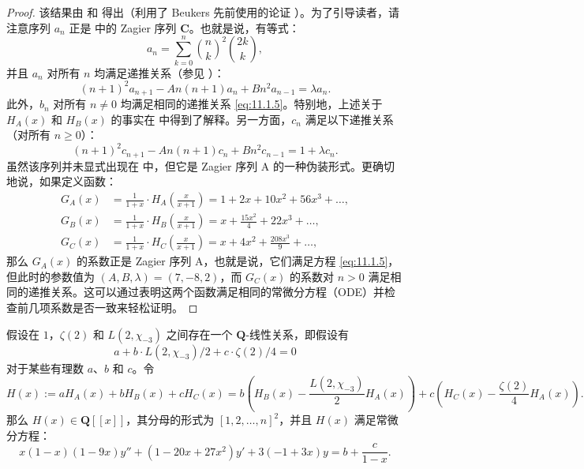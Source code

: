 \begin{proof}
该结果由 \cite[表 3]{Zag09} 和 \cite[表 5]{Zag09} 得出（利用了 Beukers 先前使用的论证 \cite{Beu87}）。为了引导读者，请注意序列 $a_n$ 正是 \cite{Zag09} 中的 Zagier 序列 $\mathbf{C}$。也就是说，有等式：
\[ a_n = \sum_{k=0}^n \binom{n}{k}^2 \binom{2k}{k}, \]
并且 $a_n$ 对所有 $n$ 均满足递推关系（参见 \cite[方程 (3)]{Zag09}）：
\begin{equation}\label{eq:11.1.5}
(n+1)^{2}a_{n+1} - An(n+1)a_{n} + Bn^{2}a_{n-1} = \lambda a_{n}.
\end{equation}
此外，$b_n$ 对所有 $n \neq 0$ 均满足相同的递推关系 \eqref{eq:11.1.5}。特别地，上述关于 $H_A(x)$ 和 $H_B(x)$ 的事实在 \cite[第 6 节]{Zag09} 中得到了解释。另一方面，$c_n$ 满足以下递推关系（对所有 $n \ge 0$）：
\begin{equation}\label{eq:11.1.6}
(n+1)^{2}c_{n+1} - An(n+1)c_{n} + Bn^{2}c_{n-1} = 1 + \lambda c_{n}.
\end{equation}
虽然该序列并未显式出现在 \cite{Zag09} 中，但它是 Zagier 序列 A 的一种伪装形式。更确切地说，如果定义函数：
\begin{equation}\label{eq:11.1.7}
\begin{aligned}
G_A(x) &= \frac{1}{1+x} \cdot H_A\left(\frac{x}{x+1}\right) = 1 + 2x + 10x^2 + 56x^3 + \dots, \\
G_B(x) &= \frac{1}{1+x} \cdot H_B\left(\frac{x}{x+1}\right) = x + \frac{15x^2}{4} + 22x^3 + \dots, \\
G_C(x) &= \frac{1}{1+x} \cdot H_C\left(\frac{x}{x+1}\right) = x + 4x^2 + \frac{208x^3}{9} + \dots,
\end{aligned}
\end{equation}
那么 $G_A(x)$ 的系数正是 Zagier 序列 A，也就是说，它们满足方程 \eqref{eq:11.1.5}，但此时的参数值为 $(A, B, \lambda) = (7, -8, 2)$，而 $G_C(x)$ 的系数对 $n > 0$ 满足相同的递推关系。这可以通过表明这两个函数满足相同的常微分方程（ODE）并检查前几项系数是否一致来轻松证明。
\end{proof}

\begin{proposition}\label{prop:11.1.8}
假设在 $1$，$\zeta(2)$ 和 $L(2, \chi_{-3})$ 之间存在一个 $\mathbf{Q}$-线性关系，即假设有
\[ a + b \cdot L(2, \chi_{-3})/2 + c \cdot \zeta(2)/4 = 0 \]
对于某些有理数 $a$、$b$ 和 $c$。令
\begin{equation}\label{eq:11.1.9}
H(x) := aH_A(x) + bH_B(x) + cH_C(x) = b\left(H_B(x) - \frac{L(2,\chi_{-3})}{2}H_A(x)\right) + c\left(H_C(x) - \frac{\zeta(2)}{4}H_A(x)\right).
\end{equation}
那么 $H(x) \in \mathbf{Q}[\! [x]\!]$，其分母的形式为 $[1, 2, \dots, n]^2$，并且 $H(x)$ 满足常微分方程：
\begin{equation}\label{eq:11.1.10}
x(1-x)(1-9x)y'' + (1-20x+27x^2)y' + 3(-1+3x)y = b + \frac{c}{1-x}.
\end{equation}
\end{proposition}

